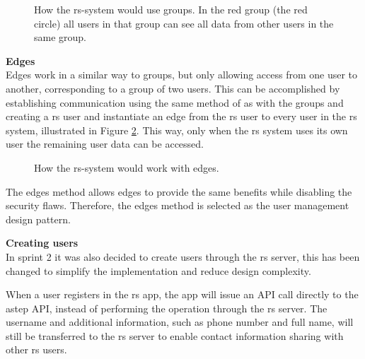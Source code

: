 \begin{figure}[h]
	\centering
	\label{fig:astepgroup}
	\caption{How the \gls{rs}-system would use groups. In the red group (the red circle) all users in that group can see all data from other users in the same group.}
\end{figure}

\textbf{Edges}\\ 
Edges work in a similar way to groups, but only allowing access from one user to another, corresponding to a group of two users.
This can be accomplished by establishing communication using the same method of as with the groups and creating a \gls{rs} user and instantiate an edge from the \gls{rs} user to every user in the \gls{rs} system, illustrated in Figure \ref{fig:astepedge}.
This way, only when the \gls{rs} system uses its own user the remaining user data can be accessed.

\begin{figure}[h]
	\centering
	\label{fig:astepedge}
	\caption{How the \gls{rs}-system would work with edges.}
\end{figure}

The edges method allows edges to provide the same benefits while disabling the security flaws.
Therefore, the edges method is selected as the user management design pattern.

\textbf{Creating users}\\
In sprint 2 it was also decided to create users through the \gls{rs} server, this has been changed to simplify the implementation and reduce design complexity.

When a user registers in the \gls{rs} app, the app will issue an API call directly to the \gls{astep} API, instead of performing the operation through the \gls{rs} server. 
The username and additional information, such as phone number and full name, will still be transferred to the \gls{rs} server to enable contact information sharing with other \gls{rs} users.